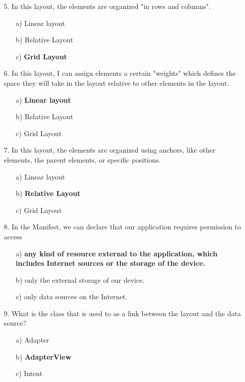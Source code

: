 \documentclass[12pt]{article}
\begin{document}
\begin{itemize}
    \item[5.] In this layout, the elements are organized "in rows and columns".
    \begin{itemize}
        \item[a)] Linear layout
        \item[b)] Relative Layout
        \item[c)] \textbf{Grid Layout}
    \end{itemize}
    
    \item[6.] In this layout, I can assign elements a certain "weights" which defines the space they will take in the layout relative to other elements in the layout.
    \begin{itemize}
        \item[a)] \textbf{Linear layout}
        \item[b)] Relative Layout
        \item[c)] Grid Layout
    \end{itemize}
    
    \item[7.] In this layout, the elements are organized using anchors, like other elements, the parent elements, or specific positions.
    \begin{itemize}
        \item[a)] Linear layout
        \item[b)] \textbf{Relative Layout}
        \item[c)] Grid Layout
    \end{itemize}
    
    \item[8.] In the Manifest, we can declare that our application requires permission to access
    \begin{itemize}
        \item[a)] \textbf{any kind of resource external to the application, which includes Internet sources or the storage of the device.}
        \item[b)] only the external storage of our device.
        \item[c)] only data sources on the Internet.
    \end{itemize}
    
    \item[9.] What is the class that is used to as a link between the layout and the data source?
    \begin{itemize}
        \item[a)] Adapter
        \item[b)] \textbf{AdapterView}
        \item[c)] Intent
    \end{itemize}


\end{itemize}
\end{document}
